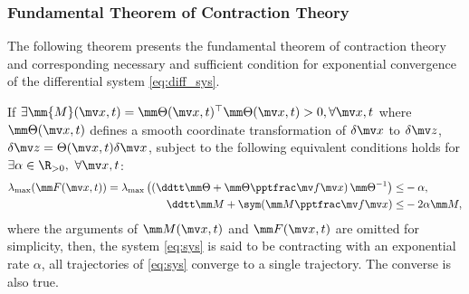 \subsubsection{Fundamental Theorem of Contraction Theory}

The following theorem presents the fundamental theorem of contraction theory and corresponding necessary and sufficient condition for exponential convergence of the differential system \eqref{eq:diff_sys}.

\begin{theorem}
    If $
        \exists \mm{M}(\bdx,t)
        =
        \mm\Theta(\bdx,t)^\top
        \mm\Theta(\bdx,t)
        > 0, \forall \bdx,t
    $ where $\mm\Theta(\bdx,t)$ defines a smooth coordinate transformation of $\delta\bdx$ to $\delta\bdz$, \ie $\delta\bdz = \Theta(\bdx,t)\delta\bdx$, subject to the following equivalent conditions holds for $\exists\alpha\in\R_{>0},\ \forall \bdx,t$:
    \begin{subequations}
        \begin{align}
            \lambda_{\max} (
                \mm F(\bdx,t)
            )
            =
            \lambda_{\max} 
            \left(
                \left(    
                \ddtt \mm\Theta
                +
                \mm\Theta\tpfpx
                \right)
                \mm\Theta^{-1}
            \right)
            \le&
            -\alpha
            ,
        \label{eq:ctrac:metric:F}
            \\
            \ddtt \mm M
            +
            \sym(\mm M\tpfpx)
            \le&
            -2\alpha\mm M
            ,
        \label{eq:ctrac:metric:M}
        \end{align}
        \label{eq:ctrac:metric}
    \end{subequations}
    where the arguments of $\mm M(\bdx,t)$ and $\mm F(\bdx,t)$ are omitted for simplicity, then, the system \eqref{eq:sys} is said to be contracting with an exponential rate $\alpha$, \ie all trajectories of \eqref{eq:sys} converge to a single trajectory.
    The converse is also true.
    \label{thm:ctrac:main}
\end{theorem}


